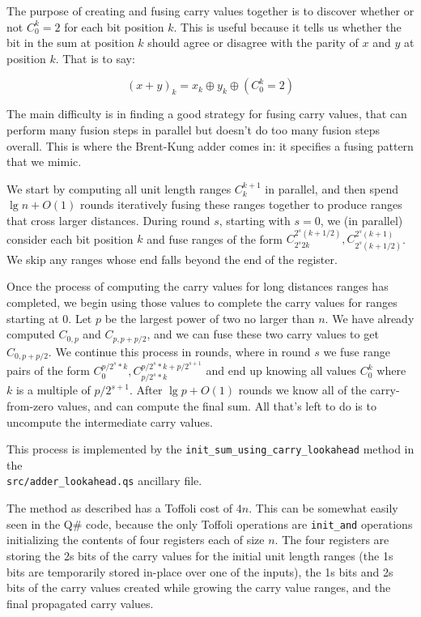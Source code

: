 \documentclass[onecolumn,unpublished]{quantumarticle}
\theoremstyle{definition}
\theoremstyle{definition}
\theoremstyle{definition}
\begin{document}
The purpose of creating and fusing carry values together is to discover whether or not $C_0^k = 2$ for each bit position $k$.
This is useful because it tells us whether the bit in the sum at position $k$ should agree or disagree with the parity of $x$ and $y$ at position $k$.
That is to say:

$$(x + y)_k = x_k \oplus y_k \oplus (C_0^k = 2)$$

The main difficulty is in finding a good strategy for fusing carry values, that can perform many fusion steps in parallel but doesn't do too many fusion steps overall.
This is where the Brent-Kung adder comes in: it specifies a fusing pattern that we mimic.

We start by computing all unit length ranges $C_k^{k+1}$ in parallel, and then spend $\lg n + O(1)$ rounds iteratively fusing these ranges together to produce ranges that cross larger distances.
During round $s$, starting with $s=0$, we (in parallel) consider each bit position $k$ and fuse ranges of the form $C_{2^s 2k}^{2^s (k+1/2)}, C_{2^s (k+1/2) }^{2^s (k+1)}$.
We skip any ranges whose end falls beyond the end of the register.

Once the process of computing the carry values for long distances ranges has completed, we begin using those values to complete the carry values for ranges starting at 0.
Let $p$ be the largest power of two no larger than $n$.
We have already computed $C_{0,p}$ and $C_{p,p+p/2}$, and we can fuse these two carry values to get $C_{0,p+p/2}$.
We continue this process in rounds, where in round $s$ we fuse range pairs of the form $C_0^{p/2^s*k}, C_{p/2^s*k}^{p/2^s*k+p/2^{s+1}}$ and end up knowing all values $C_{0}^{k}$ where $k$ is a multiple of $p/2^{s+1}$.
After $\lg p + O(1)$ rounds we know all of the carry-from-zero values, and can compute the final sum.
All that's left to do is to uncompute the intermediate carry values.

This process is implemented by the \texttt{init\_sum\_using\_carry\_lookahead} method in the \\\texttt{src/adder\_lookahead.qs} ancillary file.

The method as described has a Toffoli cost of $4n$.
This can be somewhat easily seen in the Q\# code, because the only Toffoli operations are \texttt{init\_and} operations initializing the contents of four registers each of size $n$.
The four registers are storing the 2s bits of the carry values for the initial unit length ranges (the 1s bits are temporarily stored in-place over one of the inputs), the 1s bits and 2s bits of the carry values created while growing the carry value ranges, and the final propagated carry values.
\end{document}
